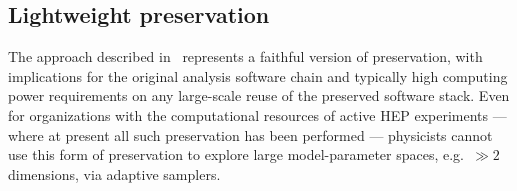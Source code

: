 \documentclass[11pt]{article}
\begin{document}



\subsection{Lightweight preservation}
\label{lightweight}

The approach described in~ represents a faithful version of preservation, with implications for the original analysis software chain and typically high computing power requirements on any large-scale reuse of the preserved software stack. Even for organizations with the computational resources of active \gls{HEP} experiments --- where at present all such preservation has been performed --- physicists cannot use this form of preservation to explore large model-parameter spaces, e.g.~$\gg 2$ dimensions, via adaptive samplers.
\end{document}
